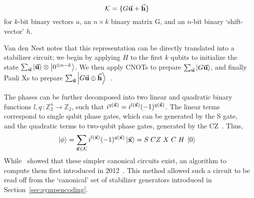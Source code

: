 \[
    \mathcal{K}=\{G\va{u} + \va{h}\}
\]
for $k$-bit binary vectors $u$, an $n\times k$ binary matrix G, and an $n$-bit binary `shift-vector' $h$.\par
Van den Nest notes that this representation can be directly translated into a stabilizer circuit; we begin by applying $H$ to the first $k$ qubits to initialize the state $\sum_{\va{u}}\ket{\va{u}}\otimes\ket{0^{\otimes n-k}}$. We then apply CNOTs to prepare $\sum_{\va{u}}\ket{G\va{u}}$, and finally Pauli Xs to prepare $\sum_{\va{u}}\ket{G\va{u}\oplus \va{h}}$~\cite{VandenNest2008}.\par
The phases can be further decomposed into two linear and quadratic binary functions $l,q\,:\mathbb{Z}_{2}^{n}\rightarrow\mathbb{Z}_{2}$, such that $i^{q(\va{x})}=i^{l(\va{x})}(-1)^{q(\va{x})}$. The linear terms correspond to single qubit phase gates, which can be generated by the S gate, and the quadratic terms to two-qubit phase gates, generated by the CZ~\cite{VandenNest2008}. Thus,
\begin{equation}
\ket{\phi}=\sum_{\va{x}\in\mathcal{K}}i^{l(\va{x})}(-1)^{q(\va{x})}\ket{\va{x}} = S\;CZ\;X\;C\;H\;\ket{0}
\label{eq:expandedaffinecirc}
\end{equation}
While~\cite{VandenNest2008} showed that these simpler canonical circuits exist, an algorithm to compute them first introduced in 2012~\cite{Garcia2012}. This method allowed such a circuit to be read off from the `canonical' set of stabilizer generators introduced in Section~\ref{sec:sympencoding}. 
